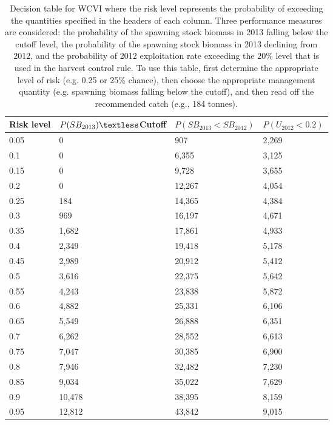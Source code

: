 %
\begin{table}[!tbp]
 \caption{Decision table for WCVI where the risk 
			level represents the probability of exceeding the quantities specified
			in the headers of each column.  Three performance measures are considered:
			the probability of the spawning stock biomass in 2013 falling below the cutoff
			level,  the probability of the spawning stock biomass in 2013 declining from 2012, 
			and the probability of 2012 exploitation rate exceeding the 20\% level that is
			used in the harvest control rule. To use this table, first determine the 
			appropriate level of risk (e.g. 0.25 or 25\% chance),  then choose the appropriate
			management quantity (e.g. spawning biomass falling below the cutoff), and then read
			off the recommended catch (e.g.,    184 tonnes).\label{Table:RiskWCVI}} 
 \begin{center}
 \begin{tabular}{llll}\hline\hline
\multicolumn{1}{c}{Risk level}&\multicolumn{1}{c}{$P(SB_{2013})\textless$Cutoff}&\multicolumn{1}{c}{$P(SB_{2013}<SB_{2012})$}&\multicolumn{1}{c}{$P(U_{2012}<0.2)$}\tabularnewline
\hline
0.05&     0&   907&2,269\tabularnewline
0.1&     0& 6,355&3,125\tabularnewline
0.15&     0& 9,728&3,655\tabularnewline
0.2&     0&12,267&4,054\tabularnewline
0.25&   184&14,365&4,384\tabularnewline
0.3&   969&16,197&4,671\tabularnewline
0.35& 1,682&17,861&4,933\tabularnewline
0.4& 2,349&19,418&5,178\tabularnewline
0.45& 2,989&20,912&5,412\tabularnewline
0.5& 3,616&22,375&5,642\tabularnewline
0.55& 4,243&23,838&5,872\tabularnewline
0.6& 4,882&25,331&6,106\tabularnewline
0.65& 5,549&26,888&6,351\tabularnewline
0.7& 6,262&28,552&6,613\tabularnewline
0.75& 7,047&30,385&6,900\tabularnewline
0.8& 7,946&32,482&7,230\tabularnewline
0.85& 9,034&35,022&7,629\tabularnewline
0.9&10,478&38,395&8,159\tabularnewline
0.95&12,812&43,842&9,015\tabularnewline
\hline
\end{tabular}

\end{center}

\end{table}

